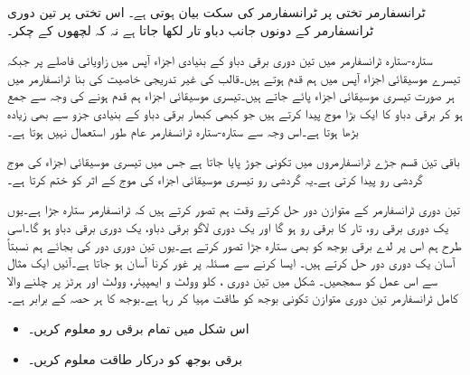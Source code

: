 ٹرانسفارمر  تختی پر ٹرانسفارمر کی سکت بیان ہوتی ہے۔ اس تختی پر تین دوری ٹرانسفارمر کے دونوں جانب  دباو تار  لکھا جاتا ہے  نہ کہ لچھوں کے چکر۔

ستارہ-ستارہ ٹرانسفارمر میں تین دوری برقی دباو  کے بنیادی اجزاء آپس میں   زاویائی فاصلے پر جبکہ  تیسرے موسیقائی اجزاء آپس میں ہم قدم ہوتے ہیں۔قالب کی غیر تدریجی خاصیت کی بنا ٹرانسفارمر میں ہر صورت تیسری موسیقائی اجزاء پائے جاتے ہیں۔تیسری موسیقائی اجزاء ہم قدم ہونے کی وجہ سے جمع ہو کر  برقی دباو کا ایک بڑا موج پیدا کرتے ہیں جو کبھی کبھار برقی دباو کے بنیادی جزو سے بھی زیادہ بڑھا ہوتا ہے۔اس وجہ سے ستارہ-ستارہ  ٹرانسفارمر عام طور استعمال نہیں ہوتا ہے۔

باقی تین قسم جڑے ٹرانسفارمروں میں تکونی جوڑ پایا جاتا ہے جس میں تیسری موسیقائی اجزاء کی موج گردشی رو پیدا کرتی ہے۔یہ گردشی رو تیسری موسیقائی اجزاء کی موج کے اثر کو ختم کرتا ہے۔



تین دوری ٹرانسفارمر کے متوازن دور حل کرتے وقت ہم تصور کرتے ہیں کہ ٹرانسفارمر ستارہ جڑا  ہے۔یوں یک دوری برقی رو، تار  کا برقی رو ہو گا اور یک دوری لاگو برقی دباو، یک دوری برقی دباو  ہو گا۔اسی طرح ہم اس پر لدے برقی بوجھ کو بھی ستارہ جڑا تصور کرتے ہے۔یوں تین دوری دور کی بجائے  ہم نسبتاً آسان یک دوری دور حل کرتے ہیں۔ ایسا کرنے سے مسئلہ پر غور کرنا آسان ہو جاتا ہے۔آئیں ایک مثال سے اس عمل کو  سمجھیں۔
%
شکل   میں تین دوری ،    کلو وولٹ و ایمپیئر،    وولٹ اور  ہرٹز پر چلنے والا کامل ٹرانسفارمر تین دوری متوازن تکونی بوجھ کو طاقت مہیا کر رہا ہے۔بوجھ کا ہر حصہ  کے برابر ہے۔
\begin{itemize}
\item
اس شکل میں تمام برقی رو معلوم کریں۔
\item
برقی بوجھ کو درکار طاقت معلوم کریں۔
\end{itemize}

